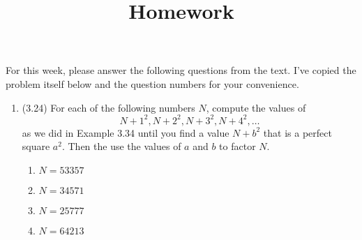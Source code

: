 \documentclass[12pt]{amsart}
\theoremstyle{definition}
\begin{document}
\title{Homework}

\maketitle

For this week, please answer the following questions from the text. 
I've copied the problem itself below and the question numbers for 
your convenience. 

\begin{enumerate}
	\item (3.24) For each of the following numbers $N$, compute 
		the values of 
	\begin{displaymath}
		N+1^2,N+2^2,N+3^2,N+4^2,\ldots 
	\end{displaymath}
	as we did in Example 3.34 until you find a value $N+b^2$ that 
	is a perfect square $a^2$. Then the use the values of $a$ and 
	$b$ to factor $N$.
	\begin{enumerate}
		\item $N = 53357$
		\item $N = 34571$
		\item $N = 25777$
		\item $N = 64213$
	\end{enumerate}


\end{enumerate}
\end{document}
